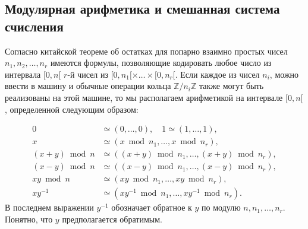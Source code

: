 \documentclass{../../template/mai_book}
\begin{document}
    \subsection{Модулярная арифметика и смешанная система \\счисления}

    \noindent Согласно китайской теореме об остатках для попарно взаимно простых чисел $n_1, n_2, \ldots, n_r$ имеются формулы, позволяющие кодировать любое число из интервала $[0, n [$ $r$-й чисел из $[0, n_1 [\times \ldots \times [0, n_r [$. Если каждое из чисел $n_i$, можно ввести в машину и обычные операции кольца $\mathbb{Z}/n_i\mathbb{Z}$ также могут быть реализованы на этой машине, то мы располагаем арифметикой на интервале $[0, n [$, определенной следующим образом:

    \begin{align*}
    0&\simeq(0,\ldots, 0),\quad 1 \simeq(1, \ldots, 1),\\
    x&\simeq(x \bmod n_1, \ldots, x \bmod n_r),\\
    (x + y) \bmod n &\simeq ((x + y) \bmod n_1, \ldots, (x + y) \bmod n_r),\\
    (x - y) \bmod n &\simeq ((x - y) \bmod n_1, \ldots, (x - y) \bmod n_r),\\
    xy \bmod n &\simeq (xy \bmod n_1, \ldots, xy \bmod n_r),\\
    xy^{-1} &\simeq (xy^{-1} \bmod n_1, \ldots, xy^{-1} \bmod n_r).
    \end{align*}
    В последнем выражении $y^{-1}$ обозначает обратное к $y$ по модулю $n, n_1, \ldots ,n_r$. Понятно, что $y$ предполагается обратимым.
\end{document}
